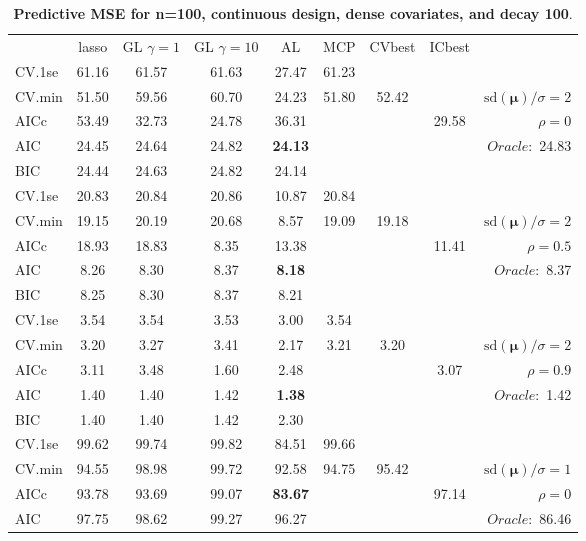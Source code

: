 \clearpage
\begin{table}\vspace{-.5cm}
\caption[l]{ { \bf Predictive MSE for n=100, continuous design, 
dense covariates, and  decay  100}.}
\vspace{-.5cm}
\footnotesize{}
\begin{center}
\begin{tabular}{l*{7}{c}|r}
 & lasso & GL $\gamma=1$ & GL $\gamma=10$ & AL & MCP  & CVbest & ICbest  \\
\cline{1-9}
CV.1se & 61.16 & 61.57 & 61.63 & 27.47 & 61.23 & & & \\
CV.min & 51.50 & 59.56 & 60.70 & 24.23 & 51.80 & 52.42 & & $\mathrm{sd}(\mathbf{\mu})/\sigma=2$ \\
AICc & 53.49 & 32.73 & 24.78 & 36.31 & & & 29.58 &  $\rho=0$ \\
AIC & 24.45 & 24.64 & 24.82 & {\bf 24.13} & & & &  \multirow{2}{*}{$Oracle: $ 24.83} \\
BIC & 24.44 & 24.63 & 24.82 & 24.14 & & & &  \\
 \hline 
CV.1se & 20.83 & 20.84 & 20.86 & 10.87 & 20.84 & & & \\
CV.min & 19.15 & 20.19 & 20.68 & 8.57 & 19.09 & 19.18 & & $\mathrm{sd}(\mathbf{\mu})/\sigma=2$ \\
AICc & 18.93 & 18.83 & 8.35 & 13.38 & & & 11.41 &  $\rho=0.5$ \\
AIC & 8.26 & 8.30 & 8.37 & {\bf 8.18} & & & &  \multirow{2}{*}{$Oracle: $ 8.37} \\
BIC & 8.25 & 8.30 & 8.37 & 8.21 & & & &  \\
 \hline 
CV.1se & 3.54 & 3.54 & 3.53 & 3.00 & 3.54 & & & \\
CV.min & 3.20 & 3.27 & 3.41 & 2.17 & 3.21 & 3.20 & & $\mathrm{sd}(\mathbf{\mu})/\sigma=2$ \\
AICc & 3.11 & 3.48 & 1.60 & 2.48 & & & 3.07 &  $\rho=0.9$ \\
AIC & 1.40 & 1.40 & 1.42 & {\bf 1.38} & & & &  \multirow{2}{*}{$Oracle: $ 1.42} \\
BIC & 1.40 & 1.40 & 1.42 & 2.30 & & & &  \\
 \hline 
CV.1se & 99.62 & 99.74 & 99.82 & 84.51 & 99.66 & & & \\
CV.min & 94.55 & 98.98 & 99.72 & 92.58 & 94.75 & 95.42 & & $\mathrm{sd}(\mathbf{\mu})/\sigma=1$ \\
AICc & 93.78 & 93.69 & 99.07 & {\bf 83.67} & & & 97.14 &  $\rho=0$ \\
AIC & 97.75 & 98.62 & 99.27 & 96.27 & & & &  \multirow{2}{*}{$Oracle: $ 86.46} \\

\end{tabular}
\end{center}
\end{table}
